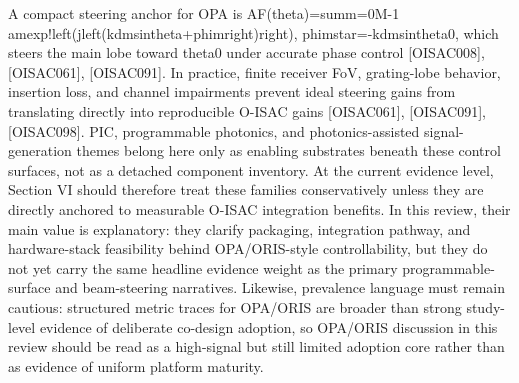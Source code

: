 {}A compact steering anchor for OPA is\markdownRendererParagraphSeparator
{}\markdownRendererDollarSign{}\markdownRendererDollarSign{}\markdownRendererSoftLineBreak
{}AF(\markdownRendererBackslash{}theta)=\markdownRendererBackslash{}sum\markdownRendererUnderscore{}\markdownRendererLeftBrace{}m=0\markdownRendererRightBrace{}\markdownRendererCircumflex{}\markdownRendererLeftBrace{}M-1\markdownRendererRightBrace{} a\markdownRendererUnderscore{}m\markdownRendererBackslash{}exp!\markdownRendererBackslash{}left(j\markdownRendererBackslash{}left(kdm\markdownRendererBackslash{}sin\markdownRendererBackslash{}theta+\markdownRendererBackslash{}phi\markdownRendererUnderscore{}m\markdownRendererBackslash{}right)\markdownRendererBackslash{}right),\markdownRendererSoftLineBreak
{}\markdownRendererDollarSign{}\markdownRendererDollarSign{}\markdownRendererSoftLineBreak
{}\markdownRendererDollarSign{}\markdownRendererDollarSign{}\markdownRendererSoftLineBreak
{}\markdownRendererBackslash{}phi\markdownRendererUnderscore{}m\markdownRendererCircumflex{}\markdownRendererLeftBrace{}\markdownRendererBackslash{}star\markdownRendererRightBrace{}=-kdm\markdownRendererBackslash{}sin\markdownRendererBackslash{}theta\markdownRendererUnderscore{}0,\markdownRendererSoftLineBreak
{}\markdownRendererDollarSign{}\markdownRendererDollarSign{}\markdownRendererParagraphSeparator
{}which steers the main lobe toward \markdownRendererDollarSign{}\markdownRendererBackslash{}theta\markdownRendererUnderscore{}0\markdownRendererDollarSign{} under accurate phase control [O\markdownRendererUnderscore{}ISAC\markdownRendererUnderscore{}008], [O\markdownRendererUnderscore{}ISAC\markdownRendererUnderscore{}061], [O\markdownRendererUnderscore{}ISAC\markdownRendererUnderscore{}091]. In practice, finite receiver FoV, grating-lobe behavior, insertion loss, and channel impairments prevent ideal steering gains from translating directly into reproducible O-ISAC gains [O\markdownRendererUnderscore{}ISAC\markdownRendererUnderscore{}061], [O\markdownRendererUnderscore{}ISAC\markdownRendererUnderscore{}091], [O\markdownRendererUnderscore{}ISAC\markdownRendererUnderscore{}098].\markdownRendererParagraphSeparator
{}PIC, programmable photonics, and photonics-assisted signal-generation themes belong here only as enabling substrates beneath these control surfaces, not as a detached component inventory. At the current evidence level, Section VI should therefore treat these families conservatively unless they are directly anchored to measurable O-ISAC integration benefits. In this review, their main value is explanatory: they clarify packaging, integration pathway, and hardware-stack feasibility behind OPA/ORIS-style controllability, but they do not yet carry the same headline evidence weight as the primary programmable-surface and beam-steering narratives. Likewise, prevalence language must remain cautious: structured metric traces for OPA/ORIS are broader than strong study-level evidence of deliberate co-design adoption, so OPA/ORIS discussion in this review should be read as a high-signal but still limited adoption core rather than as evidence of uniform platform maturity.\markdownRendererParagraphSeparator
